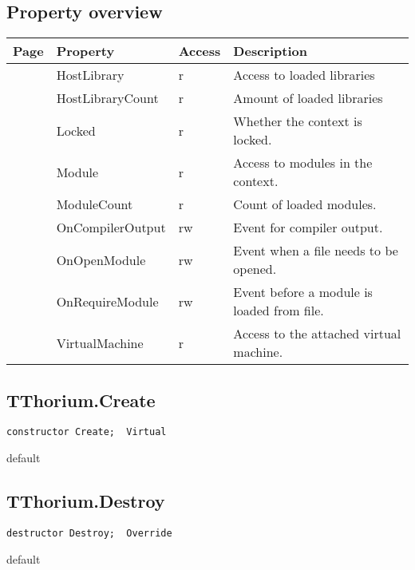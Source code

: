 \subsection{Property overview}
\label{thoriumcorepkg:thorium:tthorium:properties}
\begin{tabularx}{\textwidth}{lllX}
Page & Property & Access & Description \\ \hline
\pageref{thoriumcorepkg:thorium:tthorium:hostlibrary} & HostLibrary & r & Access to loaded libraries \\
\pageref{thoriumcorepkg:thorium:tthorium:hostlibrarycount} & HostLibraryCount & r & Amount of loaded libraries \\
\pageref{thoriumcorepkg:thorium:tthorium:locked} & Locked & r & Whether the context is locked. \\
\pageref{thoriumcorepkg:thorium:tthorium:module} & Module & r & Access to modules in the context. \\
\pageref{thoriumcorepkg:thorium:tthorium:modulecount} & ModuleCount & r & Count of loaded modules. \\
\pageref{thoriumcorepkg:thorium:tthorium:oncompileroutput} & OnCompilerOutput & rw & Event for compiler output. \\
\pageref{thoriumcorepkg:thorium:tthorium:onopenmodule} & OnOpenModule & rw & Event when a file needs to be opened. \\
\pageref{thoriumcorepkg:thorium:tthorium:onrequiremodule} & OnRequireModule & rw & Event before a module is loaded from file. \\
\pageref{thoriumcorepkg:thorium:tthorium:virtualmachine} & VirtualMachine & r & Access to the attached virtual machine. \\
\hline
\end{tabularx}
\subsection{TThorium.Create}
\label{thoriumcorepkg:thorium:tthorium:create}
\begin{FPCList}
\Declaration 

\begin{verbatim}
constructor Create;  Virtual
\end{verbatim}
\Visibility
default
\end{FPCList}
\subsection{TThorium.Destroy}
\label{thoriumcorepkg:thorium:tthorium:destroy}
\begin{FPCList}
\Declaration 

\begin{verbatim}
destructor Destroy;  Override
\end{verbatim}
\Visibility
default
\end{FPCList}
